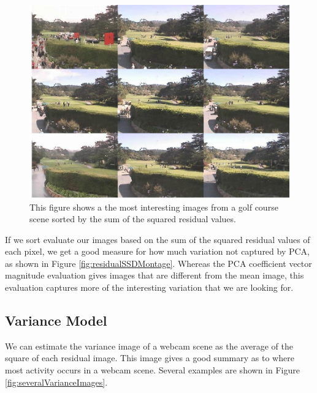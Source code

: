 \begin{figure}
	\centering
		\includegraphics[width=1\textwidth]{figures/residualSSDmontage.jpg}
	
	
		\caption[Sum Squared Residual Montage.]{This figure shows a the most interesting images from a golf course scene sorted by the sum of the squared residual values.}
		\label{fig:residualSSDmontage}
\end{figure}

If we sort evaluate our images based on the sum of the squared residual values of each pixel, we get a good measure for how much variation not captured by PCA, as shown in Figure \ref{fig:residualSSDMontage}.  Whereas the PCA coefficient vector magnitude evaluation gives images that are different from the mean image, this evaluation captures more of the interesting variation that we are looking for.


\subsection{Variance Model}

We can estimate the variance image of a webcam scene as the average of the square of each residual image.  This image gives a good summary as to where most activity occurs in a webcam scene.  Several examples are shown in Figure \ref{fig:severalVarianceImages}.

